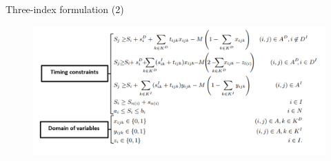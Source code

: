 \documentclass[9pt,xcolor={dvipsnames}]{beamer}
\begin{document}
\begin{frame}[shrink=20]{Three-index formulation (2)}
\begin{figure}[]
 \includegraphics[scale=0.8]{equation2.PNG}
\end{figure}
\end{frame}
\end{document}
